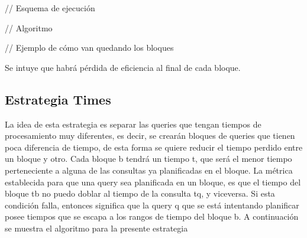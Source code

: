 // Esquema de ejecución

// Algoritmo

// Ejemplo de cómo van quedando los bloques

Se intuye que habrá pérdida de eficiencia al final de cada bloque. 


\subsection{Estrategia Times}
\label{scheduling:times}
La idea de esta estrategia es separar las queries que tengan tiempos de procesamiento muy diferentes, es decir, se crearán bloques de queries que tienen poca diferencia de tiempo, de esta forma se quiere reducir el tiempo perdido entre un bloque y otro. Cada bloque b tendrá un tiempo t, que será el menor tiempo perteneciente a alguna de las consultas ya planificadas en el bloque. La métrica establecida para que una query sea planificada en un bloque, es que el tiempo del bloque tb no puedo doblar al tiempo de la consulta tq, y viceversa. Si esta condición falla, entonces significa que la query q que se está intentando planificar posee tiempos que se escapa a los rangos de tiempo del bloque b. A continuación se muestra el algoritmo para la presente estrategia


